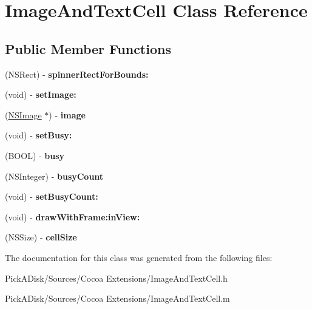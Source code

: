 \hypertarget{interface_image_and_text_cell}{
\section{ImageAndTextCell Class Reference}
\label{interface_image_and_text_cell}
}
\subsection*{Public Member Functions}
\begin{DoxyCompactItemize}
\item 
\hypertarget{interface_image_and_text_cell_a7983857a65a596ee54000f89ec742e93}{
(NSRect) -\/ {\bfseries spinnerRectForBounds:}}
\label{interface_image_and_text_cell_a7983857a65a596ee54000f89ec742e93}

\item 
\hypertarget{interface_image_and_text_cell_ace0df38d5c9574b505aea28c0a7eaaf5}{
(void) -\/ {\bfseries setImage:}}
\label{interface_image_and_text_cell_ace0df38d5c9574b505aea28c0a7eaaf5}

\item 
\hypertarget{interface_image_and_text_cell_af10749e9a4183c4f7464aee59c15a6f0}{
(\hyperlink{class_n_s_image}{NSImage} $\ast$) -\/ {\bfseries image}}
\label{interface_image_and_text_cell_af10749e9a4183c4f7464aee59c15a6f0}

\item 
\hypertarget{interface_image_and_text_cell_ac5fa984a2b9284e81dc2cc06e9b567d4}{
(void) -\/ {\bfseries setBusy:}}
\label{interface_image_and_text_cell_ac5fa984a2b9284e81dc2cc06e9b567d4}

\item 
\hypertarget{interface_image_and_text_cell_a43766a1ff37487d279d9349abb027666}{
(BOOL) -\/ {\bfseries busy}}
\label{interface_image_and_text_cell_a43766a1ff37487d279d9349abb027666}

\item 
\hypertarget{interface_image_and_text_cell_ab9297e0ce03400ffbdd23793646e456f}{
(NSInteger) -\/ {\bfseries busyCount}}
\label{interface_image_and_text_cell_ab9297e0ce03400ffbdd23793646e456f}

\item 
\hypertarget{interface_image_and_text_cell_a7fbc7110428ab196d53f7ffaf798aa87}{
(void) -\/ {\bfseries setBusyCount:}}
\label{interface_image_and_text_cell_a7fbc7110428ab196d53f7ffaf798aa87}

\item 
\hypertarget{interface_image_and_text_cell_a0d4b381d8fe0344503a262c552ba8c04}{
(void) -\/ {\bfseries drawWithFrame:inView:}}
\label{interface_image_and_text_cell_a0d4b381d8fe0344503a262c552ba8c04}

\item 
\hypertarget{interface_image_and_text_cell_ac18b2362313f4425d4e66dc677bddc18}{
(NSSize) -\/ {\bfseries cellSize}}
\label{interface_image_and_text_cell_ac18b2362313f4425d4e66dc677bddc18}

\end{DoxyCompactItemize}


The documentation for this class was generated from the following files:\begin{DoxyCompactItemize}
\item 
PickADisk/Sources/Cocoa Extensions/ImageAndTextCell.h\item 
PickADisk/Sources/Cocoa Extensions/ImageAndTextCell.m\end{DoxyCompactItemize}
